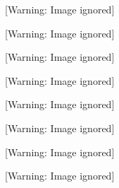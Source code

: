 \begin{figure}[h]

 [Warning: Image ignored] %

\end{figure}

\begin{figure}[h]

 [Warning: Image ignored] %

\end{figure}

\begin{figure}[h]

 [Warning: Image ignored] %

\end{figure}

\begin{figure}[h]

 [Warning: Image ignored] %

\end{figure}

\begin{figure}[h]

 [Warning: Image ignored] %

\end{figure}

\begin{figure}[h]

 [Warning: Image ignored] %

\end{figure}

\begin{figure}[h]

 [Warning: Image ignored] %

\end{figure}

\begin{figure}[h]

 [Warning: Image ignored] %

\end{figure}

